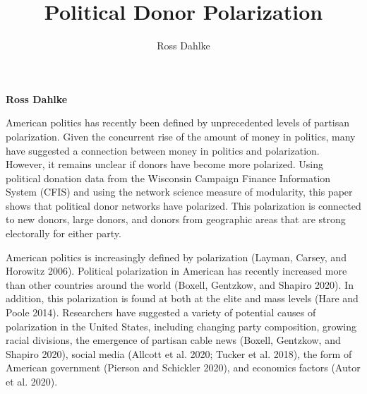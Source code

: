 \documentclass[12pt,]{article}
\title{Political Donor Polarization  }
\author{\Large Ross Dahlke\vspace{0.05in} \newline\normalsize\emph{}  }
\date{}
\newcommand*{\authorfont}{\fontfamily{phv}\selectfont}
\renewenvironment{abstract}
 {{%
    \setlength{\leftmargin}{0mm}
    \setlength{\rightmargin}{\leftmargin}%
  }%
  \relax}
 {\endlist}
\begin{document}
	
%

{%
\setlength{\parindent}{0pt}
\thispagestyle{plain}
{\fontsize{18}{20}\selectfont\raggedright 
\maketitle  %

}

{
   \vskip 13.5pt\relax \normalsize\fontsize{11}{12} 
\textbf{\authorfont Ross Dahlke} \hskip 15pt \emph{\small }   

}

}








\begin{abstract}

    \hbox{\vrule height .2pt width 39.14pc}

    \vskip 8.5pt %

\noindent American politics has recently been defined by unprecedented levels of
partisan polarization. Given the concurrent rise of the amount of money
in politics, many have suggested a connection between money in politics
and polarization. However, it remains unclear if donors have become more
polarized. Using political donation data from the Wisconsin Campaign
Finance Information System (CFIS) and using the network science measure
of modularity, this paper shows that political donor networks have
polarized. This polarization is connected to new donors, large donors,
and donors from geographic areas that are strong electorally for either
party.


    \hbox{\vrule height .2pt width 39.14pc}


\end{abstract}


\vskip -8.5pt



\noindent \doublespacing 

\newpage

American politics is increasingly defined by polarization (Layman,
Carsey, and Horowitz 2006). Political polarization in American has
recently increased more than other countries around the world (Boxell,
Gentzkow, and Shapiro 2020). In addition, this polarization is found at
both at the elite and mass levels (Hare and Poole 2014). Researchers
have suggested a variety of potential causes of polarization in the
United States, including changing party composition, growing racial
divisions, the emergence of partisan cable news (Boxell, Gentzkow, and
Shapiro 2020), social media (Allcott et al. 2020; Tucker et al. 2018),
the form of American government (Pierson and Schickler 2020), and
economics factors (Autor et al. 2020).
\end{document}
